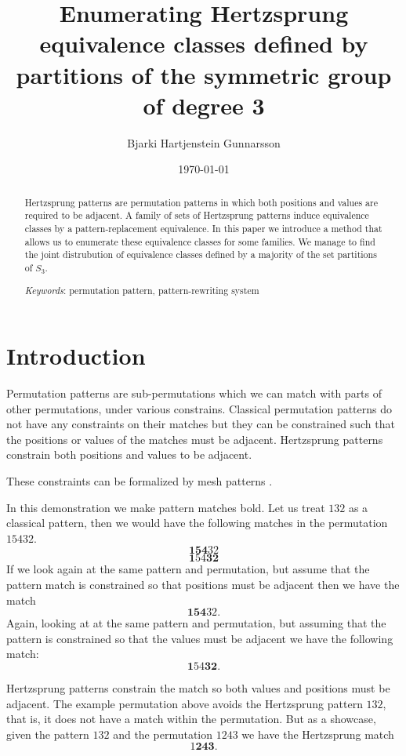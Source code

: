 \documentclass[a4paper, 11pt, english]{article}
\newcommand{\breath}{\vspace{6pt plus 2pt minus 1pt}\noindent}
\theoremstyle{definition}
\newcommand{\Sym}{S}
\begin{document}
\title{Enumerating Hertzsprung equivalence classes defined by partitions of the symmetric group of degree 3}
\author{Bjarki Hartjenstein Gunnarsson}
\date{\today}
\maketitle

\begin{abstract}
    Hertzsprung patterns are permutation patterns in which both positions and values are required to
    be adjacent. A family of sets of Hertzsprung patterns induce equivalence classes by
    a pattern-replacement equivalence. In this paper we introduce a method that allows us 
    to enumerate these equivalence classes for some families. We manage to find the joint
    distrubution of equivalence classes defined by a majority of the set partitions of $\Sym_3$.

    \breath \emph{Keywords}: permutation pattern, pattern-rewriting system
\end{abstract}

\section{Introduction}
Permutation patterns are sub-permutations which we can match with parts of other
permutations, under various constrains. 
Classical permutation patterns do not have any constraints on their matches but they can
be constrained such that the positions or values of the matches must be adjacent.
Hertzsprung patterns constrain both positions and values to be adjacent. 

These constraints can be formalized by mesh patterns \cite{claesson:2011}.

In this demonstration we make pattern matches bold.  Let us treat $132$ as a classical
pattern, then we would have the following matches in the permutation $15432$.
\[
    \bm{154}32
\]
\[
    \bm{1}54\bm{32}
\]
If we look again at the same pattern and permutation, but assume that the
pattern match is constrained so that positions must be adjacent then we have the match
\[
    \bm{154}32.
\]
Again, looking at at the same pattern and permutation, but assuming that the
pattern is constrained so that the values must be adjacent we have the following
match:
\[
    \bm{1}54\bm{32}.
\]

Hertzsprung patterns constrain the match so both values and positions must be
adjacent. The example permutation above avoids the Hertzsprung pattern $132$, that is, it does not have a match
within the permutation. But as a showcase, given the pattern $132$ and the permutation $1243$ we
have the Hertzsprung match
\[
    1\bm{243}.
\]
\end{document}
